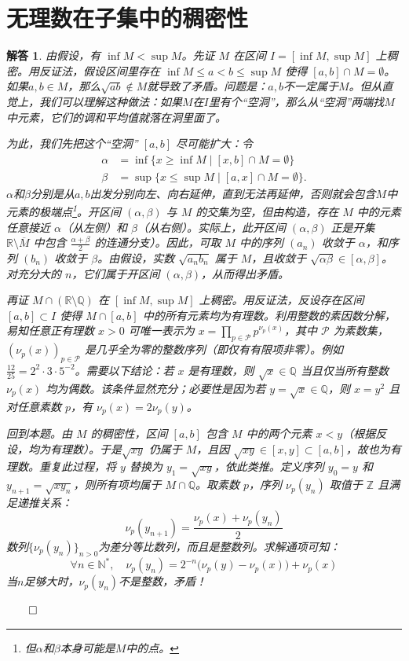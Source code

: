 \documentclass[12pt,UTF8,fontset=none]{ctexbook}
\theoremstyle{exercisestyle}
\theoremstyle{solutionstyle}
\newtheorem*{solution*}{解答}
\newenvironment{solution}
  {\begin{solution*}}
  {\hfill\ensuremath{\qed}\end{solution*}}
\begin{document}
\section{无理数在子集中的稠密性}
\begin{solution}
  由假设，有 \( \inf M < \sup M \)。先证 \( M \) 在区间 \( I = [\inf M, \sup M] \) 上稠密。用反证法，假设区间里存在 \( \inf M \leqslant a < b \leqslant \sup M \) 使得 \( [a, b] \cap M = \emptyset \)。如果$a,b\in M$，那么$\sqrt{ab}\notin M$就导致了矛盾。问题是：$a,b$不一定属于$M$。但从直觉上，我们可以理解这种做法：如果$M$在$I$里有个“空洞”，那么从“空洞”两端找$M$中元素，它们的调和平均值就落在洞里面了。
  
  为此，我们先把这个“空洞” \( [a, b] \) 尽可能扩大：令
  \begin{align*}
  \alpha &= \inf \{ x \geqslant \inf M \mid [x, b] \cap M = \emptyset \} \\
  \beta &= \sup \{ x \leqslant \sup M \mid [a, x] \cap M = \emptyset \}.
  \end{align*}
  $\alpha$和$\beta$分别是从$a, b$出发分别向左、向右延伸，直到无法再延伸，否则就会包含$M$中元素的极端点\footnote{但$\alpha$和$\beta$本身可能是$M$中的点。}。开区间 \( (\alpha, \beta) \) 与 \( M \) 的交集为空，但由构造，存在 \( M \) 中的元素任意接近 \( \alpha \)（从左侧）和 \( \beta \)（从右侧）。实际上，此开区间 \( (\alpha, \beta) \) 正是开集 \( \mathbb{R} \setminus \overline{M} \) 中包含 \( \frac{\alpha + \beta}{2} \) 的连通分支）。因此，可取 \( M \) 中的序列 \( (a_n) \) 收敛于 \( \alpha \)，和序列 \( (b_n) \) 收敛于 \( \beta \)。由假设，实数 \( \sqrt{a_n b_n} \) 属于 \( M \)，且收敛于 \( \sqrt{\alpha \beta} \in [\alpha, \beta] \)。对充分大的 \( n \)，它们属于开区间 \( (\alpha, \beta) \)，从而得出矛盾。

  再证 \( M \cap (\mathbb{R} \setminus \mathbb{Q}) \) 在 \( [\inf M, \sup M] \) 上稠密。用反证法，反设存在区间 \( [a, b] \subset I \) 使得 \( M \cap [a, b] \) 中的所有元素均为有理数。利用整数的素因数分解，易知任意正有理数 \( x > 0 \) 可唯一表示为 \( x = \prod_{p \in \mathcal{P}} p^{\nu_p(x)} \)，其中 \( \mathcal{P} \) 为素数集，\( (\nu_p(x))_{p \in \mathcal{P}} \) 是几乎全为零的整数序列（即仅有有限项非零）。例如 \( \frac{12}{25} = 2^2 \cdot 3 \cdot 5^{-2} \)。需要以下结论：若 \( x \) 是有理数，则 \( \sqrt{x} \in \mathbb{Q} \) 当且仅当所有整数 \( \nu_p(x) \) 均为偶数。该条件显然充分；必要性是因为若 \( y = \sqrt{x} \in \mathbb{Q} \)，则 \( x = y^2 \) 且对任意素数 \( p \)，有 \( \nu_p(x) = 2\nu_p(y) \)。

  回到本题。由 \( M \) 的稠密性，区间 \( [a, b] \) 包含 \( M \) 中的两个元素 \( x < y \)（根据反设，均为有理数）。于是\( \sqrt{xy} \) 仍属于 \( M \)，且因 \( \sqrt{xy} \in [x, y] \subset [a, b] \)，故也为有理数。重复此过程，将 \( y \) 替换为 \( y_1 = \sqrt{xy} \)，依此类推。定义序列 \( y_0 = y \) 和 \( y_{n+1} = \sqrt{x y_n} \)，则所有项均属于 \( M \cap \mathbb{Q} \)。取素数 \( p \)，序列 \( \nu_p(y_n) \) 取值于 \( \mathbb{Z} \) 且满足递推关系：
  \[ \nu_p(y_{n+1}) = \frac{\nu_p(x) + \nu_p(y_n)}{2} \]
  数列$\{\nu_p(y_n)\}_{n>0}$为差分等比数列，而且是整数列。求解通项可知：
  \[\forall n\in \mathbb{N}^*, \quad \nu_p(y_n) = 2^{-n}\big(\nu_p(y) - \nu_p(x)\big) + \nu_p(x) \]
  当$n$足够大时，$\nu_p(y_n)$不是整数，矛盾！


\end{solution}
\end{document}
